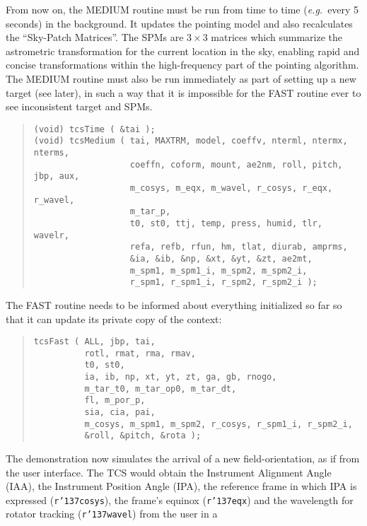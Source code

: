 \documentclass[12pt,fleqn,twoside]{article}
\renewcommand{\_}{{\tt\char'137}}     %
\begin{document}
From now on, the MEDIUM routine must be run from time to time
({\it e.g.}~every 5 seconds) in the background.  It updates the pointing
model and also recalculates the ``Sky-Patch Matrices''.  The SPMs are
$3\times3$ matrices which summarize the astrometric transformation for the
current location in the sky, enabling rapid and concise
transformations within the high-frequency part of the pointing
algorithm.  The MEDIUM routine must also be run immediately as part
of setting up a new target (see later), in such a way that it is
impossible for the FAST routine ever to see inconsistent target and
SPMs.
\begin{quote}
\begin{small}
\begin{verbatim}
(void) tcsTime ( &tai );
(void) tcsMedium ( tai, MAXTRM, model, coeffv, nterml, ntermx, nterms,
                   coeffn, coform, mount, ae2nm, roll, pitch, jbp, aux,
                   m_cosys, m_eqx, m_wavel, r_cosys, r_eqx, r_wavel,
                   m_tar_p,
                   t0, st0, ttj, temp, press, humid, tlr, wavelr,
                   refa, refb, rfun, hm, tlat, diurab, amprms,
                   &ia, &ib, &np, &xt, &yt, &zt, ae2mt,
                   m_spm1, m_spm1_i, m_spm2, m_spm2_i,
                   r_spm1, r_spm1_i, r_spm2, r_spm2_i );
\end{verbatim}\end{small}
\end{quote}
The FAST routine needs to be informed about everything initialized
so far so that it can update its private copy of the context:
\begin{quote}
\begin{small}
\begin{verbatim}
tcsFast ( ALL, jbp, tai,
          rotl, rmat, rma, rmav,
          t0, st0,
          ia, ib, np, xt, yt, zt, ga, gb, rnogo,
          m_tar_t0, m_tar_op0, m_tar_dt,
          fl, m_por_p,
          sia, cia, pai,
          m_cosys, m_spm1, m_spm2, r_cosys, r_spm1_i, r_spm2_i,
          &roll, &pitch, &rota );
\end{verbatim}\end{small}
\end{quote}
The demonstration now simulates the arrival of a new
field-orientation, as if from the user interface.
The TCS
would obtain the Instrument Alignment Angle (IAA), the
Instrument Position Angle (IPA), the reference frame in which
IPA is expressed ({\tt r\_cosys}),
the frame's equinox ({\tt r\_eqx}) and the
wavelength for rotator tracking ({\tt r\_wavel}) from the user in a
\end{document}

